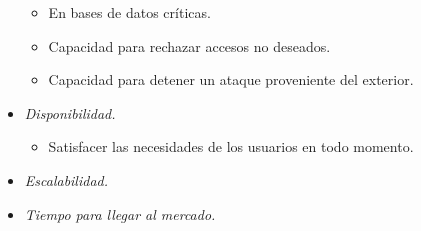 \begin{itemize}
\begin{itemize}
					\item En bases de datos críticas.
					\item Capacidad para rechazar accesos no deseados.
					\item Capacidad para detener un ataque proveniente del exterior.
				\end{itemize}
			\item \textit{Disponibilidad.}
				\begin{itemize}
					\item Satisfacer las necesidades de los usuarios en todo momento.
				\end{itemize}
			\item \textit{Escalabilidad.}
			\item \textit{Tiempo para llegar al mercado.}
		\end{itemize}	
		
